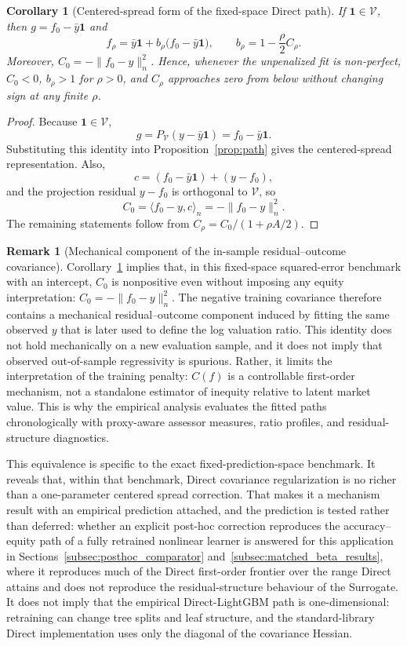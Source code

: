 \documentclass[10pt]{article}
\newtheorem{corollary}{Corollary}
\theoremstyle{definition}
\newtheorem{remark}{Remark}
\newcommand{\1}{\mathbf{1}}
\newcommand{\Vcal}{\mathcal{V}}
\begin{document}
{\begin{corollary}[Centered-spread form of the fixed-space Direct path]
\label{cor:path_scaling}
If $\1\in\Vcal$, then $g=f_0-\bar y\1$ and
\[
f_\rho
=
\bar y\1
+
b_\rho\bigl(f_0-\bar y\1\bigr),
\qquad
b_\rho
=
1-\frac{\rho}{2}C_\rho.
\]
Moreover, $C_0=-\|f_0-y\|_n^2$. Hence, whenever the unpenalized fit is non-perfect, $C_0<0$, $b_\rho>1$ for $\rho>0$, and $C_\rho$ approaches zero from below without changing sign at any finite $\rho$.
\end{corollary}

\begin{proof}
Because $\1\in\Vcal$,
\[
g=P_{\Vcal}(y-\bar y\1)=f_0-\bar y\1.
\]
Substituting this identity into Proposition~\ref{prop:path} gives the centered-spread representation. Also,
\[
c=(f_0-\bar y\1)+(y-f_0),
\]
and the projection residual $y-f_0$ is orthogonal to $\Vcal$, so
\[
C_0
=
\langle f_0-y,c\rangle_n
=
-\|f_0-y\|_n^2.
\]
The remaining statements follow from $C_\rho=C_0/(1+\rho A/2)$.
\end{proof}

\begin{remark}[Mechanical component of the in-sample residual--outcome covariance]
\label{rem:mechanical_covariance}
Corollary~\ref{cor:path_scaling} implies that, in this fixed-space squared-error benchmark with an intercept, $C_0$ is nonpositive even without imposing any equity interpretation: $C_0=-\|f_0-y\|_n^2$. The negative training covariance therefore contains a mechanical residual--outcome component induced by fitting the same observed $y$ that is later used to define the log valuation ratio. This identity does not hold mechanically on a new evaluation sample, and it does not imply that observed out-of-sample regressivity is spurious. Rather, it limits the interpretation of the training penalty: $C(f)$ is a controllable first-order mechanism, not a standalone estimator of inequity relative to latent market value. This is why the empirical analysis evaluates the fitted paths chronologically with proxy-aware assessor measures, ratio profiles, and residual-structure diagnostics.
\end{remark}


This equivalence is specific to the exact fixed-prediction-space benchmark. It reveals that, within that benchmark, Direct covariance regularization is no richer than a one-parameter centered spread correction. That makes it a mechanism result with an empirical prediction attached, and the prediction is tested rather than deferred: whether an explicit post-hoc correction reproduces the accuracy--equity path of a fully retrained nonlinear learner is answered for this application in Sections~\ref{subsec:posthoc_comparator} and~\ref{subsec:matched_beta_results}, where it reproduces much of the Direct first-order frontier over the range Direct attains and does not reproduce the residual-structure behaviour of the Surrogate. It does not imply that the empirical Direct-LightGBM path is one-dimensional: retraining can change tree splits and leaf structure, and the standard-library Direct implementation uses only the diagonal of the covariance Hessian.

}
\end{document}

